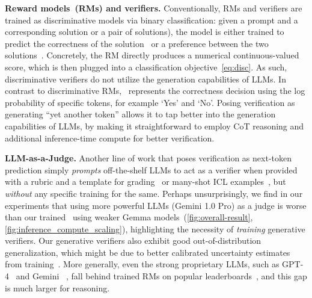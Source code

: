 
\textbf{Reward models~(RMs) and verifiers.} Conventionally, RMs and verifiers are trained as discriminative models via binary classification: given a prompt and a corresponding solution or a pair of solutions), the model is either trained to predict the correctness of the solution~\citep{cobbe2021training, lightman2023let, wang2023math, uesato2022solving, luo2024improve, yu2024ovm} or a preference between the two solutions~\citep{stiennon2020learning, nakano2021webgpt}. Concretely, the RM directly produces a numerical continuous-valued score, which is then plugged into a classification objective~\eqref{eq:disc}. As such, discriminative verifiers do not utilize the generation capabilities of LLMs. In contrast to discriminative RMs, \genV\ represents the correctness decision using the log probability of specific tokens, for example `Yes' and `No'. Posing verification as generating ``yet another token'' allows it to tap better into the generation capabilities of LLMs, by making it straightforward to employ CoT reasoning and additional inference-time compute for better verification. 

\textbf{LLM-as-a-Judge.} Another line of work that poses verification as next-token prediction simply \emph{prompts} off-the-shelf LLMs to act as a verifier when provided with a rubric and a template for grading~\citep{zheng2024judging, bai2022constitutional, kim2023prometheus, deductive-verification} or many-shot ICL examples~\citep{agarwal2024many}, but \emph{without} any specific training for the same. Perhaps unsurprisingly, we find in our experiments that using more powerful LLMs (Gemini 1.0 Pro) as a judge is worse than our trained \genV\ using weaker Gemma models~(\autoref{fig:overall-result}, \ref{fig:inference_compute_scaling}), highlighting the necessity of \emph{training} generative verifiers. Our generative verifiers also exhibit good out-of-distribution generalization, which might be due to better calibrated uncertainty estimates from training~\citep{kapoor2024large}. More generally, even the strong proprietary LLMs, such as GPT-4~\citep{gpt-4-technical-report} and Gemini ~\citep{team2024gemini}, fall behind trained RMs on popular leaderboards~\citep{rewardbench}, and this gap is much larger for reasoning. 

